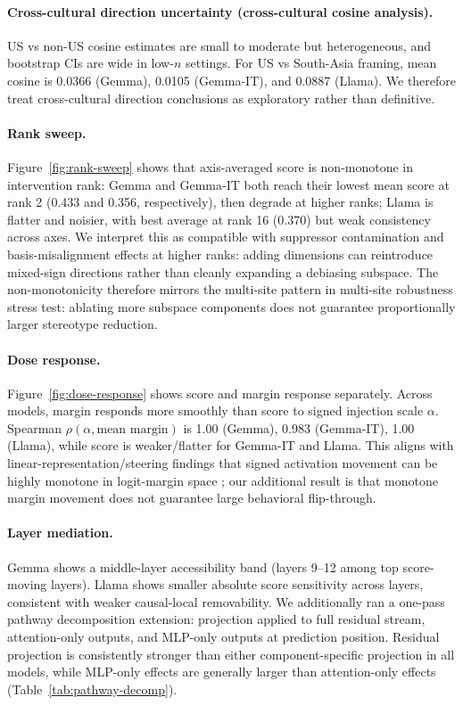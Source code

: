 \paragraph{Cross-cultural direction uncertainty (cross-cultural cosine analysis).}
US vs non-US cosine estimates are small to moderate but heterogeneous, and bootstrap CIs are wide in low-$n$ settings. For US vs South-Asia framing, mean cosine is 0.0366 (Gemma), 0.0105 (Gemma-IT), and 0.0887 (Llama). We therefore treat cross-cultural direction conclusions as exploratory rather than definitive.

\paragraph{Rank sweep.}
Figure~\ref{fig:rank-sweep} shows that axis-averaged score is non-monotone in intervention rank: Gemma and Gemma-IT both reach their lowest mean score at rank 2 (0.433 and 0.356, respectively), then degrade at higher ranks; Llama is flatter and noisier, with best average at rank 16 (0.370) but weak consistency across axes. We interpret this as compatible with suppressor contamination and basis-misalignment effects at higher ranks: adding dimensions can reintroduce mixed-sign directions rather than cleanly expanding a debiasing subspace. The non-monotonicity therefore mirrors the multi-site pattern in multi-site robustness stress test: ablating more subspace components does not guarantee proportionally larger stereotype reduction.

\paragraph{Dose response.}
Figure~\ref{fig:dose-response} shows score and margin response separately. Across models, margin responds more smoothly than score to signed injection scale $\alpha$. Spearman $\rho(\alpha, \text{mean margin})$ is 1.00 (Gemma), 0.983 (Gemma-IT), 1.00 (Llama), while score is weaker/flatter for Gemma-IT and Llama. This aligns with linear-representation/steering findings that signed activation movement can be highly monotone in logit-margin space \citep{zou2023repeng,park2023linear}; our additional result is that monotone margin movement does not guarantee large behavioral flip-through.

\paragraph{Layer mediation.}
Gemma shows a middle-layer accessibility band (layers 9--12 among top score-moving layers). Llama shows smaller absolute score sensitivity across layers, consistent with weaker causal-local removability. We additionally ran a one-pass pathway decomposition extension: projection applied to full residual stream, attention-only outputs, and MLP-only outputs at prediction position. Residual projection is consistently stronger than either component-specific projection in all models, while MLP-only effects are generally larger than attention-only effects (Table~\ref{tab:pathway-decomp}).

